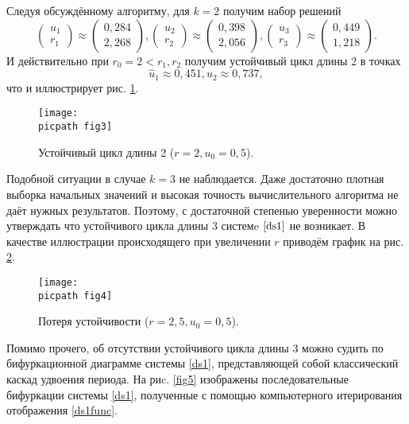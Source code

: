 \documentclass[oneside,final,12pt]{article}
\newcommand*\picsize{0.5\textwidth}
\newcommand*\picpath{pictures/}
\theoremstyle{plain}
\theoremstyle{remark}
\theoremstyle{definition}
\theoremstyle{plain}
\begin{document}
	\bigskip
	Следуя обсуждённому алгоритму, для \(k = 2\)  получим набор решений
	\[\begin{pmatrix} u_1 \\ r_1\end{pmatrix} \approx \begin{pmatrix} 0,284\\ 2,268\end{pmatrix}, \begin{pmatrix} u_2 \\ r_2\end{pmatrix} \approx \begin{pmatrix} 0,398 \\ 2,056 \end{pmatrix}, \begin{pmatrix} u_3 \\ r_3 \end{pmatrix} \approx \begin{pmatrix} 0,449\\ 1,218\end{pmatrix}.\]
	И действительно при \( r_0 = 2 < r_1, r_2\) получим устойчивый цикл длины 2 в точках
	\[\hat u_1 \approx 0,451, \hat u_2 \approx 0,737,\]
	что и иллюстрирует	рис. \ref{fig3}.

	\begin{figure}[!h]
			\centering
			\texttt{[image: \\picpath fig3]}
			\caption{Устойчивый цикл длины 2 (\(r = 2, u_0 = 0,5\)).} \label{fig3}
	\end{figure}
	
	Подобной ситуации в случае \(k = 3\) не наблюдается. Даже достаточно плотная выборка начальных значений и высокая точность вычислительного алгоритма не даёт нужных результатов. Поэтому, с достаточной степенью уверенности можно утверждать что устойчивого цикла длины \(3\)  системe \(\eqref{ds1}\) не возникает. В качестве иллюстрации происходящего при увеличении \(r\) приводём график на рис. \ref{fig4}.

	\begin{figure}[!h]
			\centering
			\texttt{[image: \\picpath fig4]}
			\caption{Потеря устойчивости (\(r = 2,5,  u_0 = 0,5\)).} \label{fig4}
	\end{figure}

	Помимо прочего, об отсутствии устойчивого цикла длины \(3\) можно судить по бифуркационной диаграмме системы \eqref{ds1}, представляющей собой классический каскад удвоения периода. На риc. \ref{fig5} изображены последовательные бифуркации системы \eqref{ds1}, полученные с помощью компьютерного итерирования отображения \eqref{ds1func}.
\end{document}
